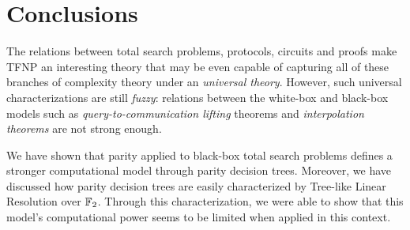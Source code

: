 \chapter*{Conclusions}



The relations between total search problems, protocols, circuits and proofs make \textsf{TFNP} an interesting theory that may be even capable of capturing all of these branches of complexity theory under an \textit{universal theory}. However, such universal characterizations are still \textit{fuzzy}: relations between the white-box and black-box models such as \textit{query-to-communication lifting} theorems and \textit{interpolation theorems} are not strong enough.

We have shown that parity applied to black-box total search problems defines a stronger computational model through parity decision trees. Moreover, we have discussed how parity decision trees are easily characterized by Tree-like Linear Resolution over $\mathbb{F}_2$. Through this characterization, we were able to show that this model's computational power seems to be limited when applied in this context.


